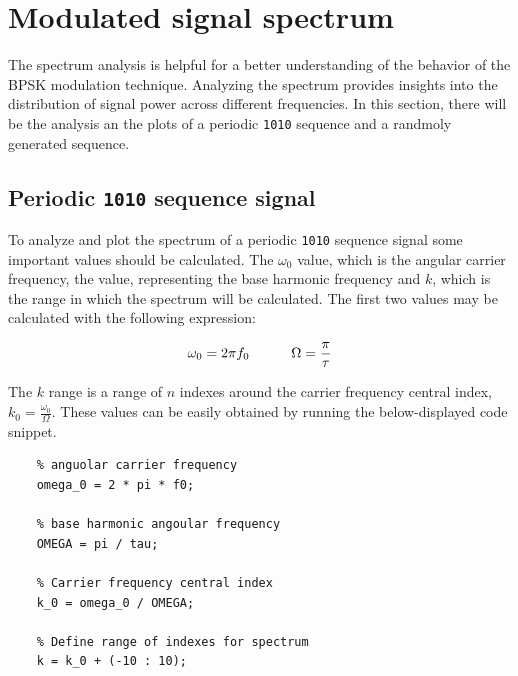 \vspace{40px} \section{Modulated signal spectrum}
The spectrum analysis is helpful for a better understanding of the behavior of the BPSK modulation technique. Analyzing the spectrum provides insights into the distribution of signal power across different frequencies. In this section, there will be the analysis an the plots of a periodic \texttt{1010} sequence and a randmoly generated sequence.





\subsection{Periodic \texttt{1010} sequence signal}
To analyze and plot the spectrum of a periodic \texttt{1010} sequence signal some important values should be calculated. The $\omega_0$ value, which is the angular carrier frequency, the value, representing the base harmonic frequency and $k$, which is the range in which the spectrum will be calculated. The first two values may be calculated with the following expression:

\begin{equation*}
    \omega_0 = 2\pi f_0 \hspace{30px} \Omega = \frac{\pi}{\tau}
\end{equation*}

\noindent The $k$ range is a range of $n$ indexes around the carrier frequency central index, $k_0 = \frac{\omega_0}{\Omega}$. These values can be easily obtained by running the below-displayed code snippet.

\begin{lstlisting}
    % anguolar carrier frequency
    omega_0 = 2 * pi * f0; 

    % base harmonic angoular frequency 
    OMEGA = pi / tau; 

    % Carrier frequency central index
    k_0 = omega_0 / OMEGA;

    % Define range of indexes for spectrum
    k = k_0 + (-10 : 10);
\end{lstlisting}

